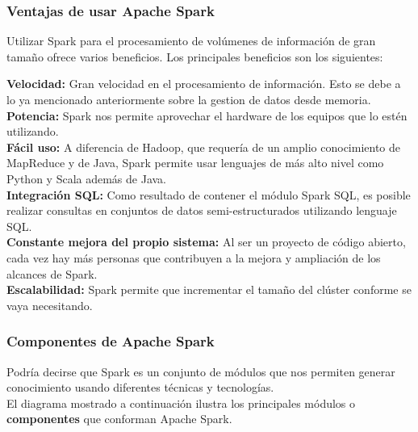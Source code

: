 \subsubsection{Ventajas de usar Apache Spark}
Utilizar Spark para el procesamiento de volúmenes de información de gran tamaño ofrece varios beneficios. Los principales beneficios son los siguientes:\\

\begin{UClist}
	\UCli \textbf{Velocidad:} Gran velocidad en el procesamiento de información. Esto se debe a lo ya mencionado anteriormente sobre la gestion de datos desde memoria.\\
	\UCli \textbf{Potencia:} Spark nos permite aprovechar el hardware de los equipos que lo estén utilizando.\\

	\UCli \textbf{Fácil uso:} A diferencia de Hadoop, que requería de un amplio conocimiento de MapReduce y de Java, Spark permite usar lenguajes de más alto nivel como Python y Scala además de Java.\\

	\UCli \textbf{Integración SQL:} Como resultado de contener el módulo Spark SQL, es posible realizar consultas en conjuntos de datos semi-estructurados utilizando lenguaje SQL.\\

	\UCli \textbf{Constante mejora del propio sistema:} Al ser un proyecto de código abierto, cada vez hay más personas que contribuyen a la mejora y ampliación de los alcances de Spark.\\

	\UCli \textbf{Escalabilidad:} Spark permite que incrementar el tamaño del clúster conforme se vaya necesitando.\\
\end{UClist}

\subsubsection{Componentes de Apache Spark}
Podría decirse que Spark es un conjunto de módulos que nos permiten generar conocimiento usando diferentes técnicas y tecnologías.\\

El diagrama mostrado a continuación ilustra los principales módulos o \textbf{componentes} que conforman Apache Spark.\\

